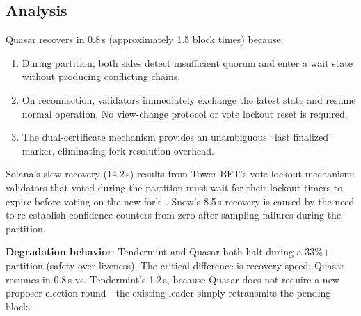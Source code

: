 \subsection{Analysis}

Quasar recovers in 0.8\,s (approximately 1.5 block times) because:

\begin{enumerate}
\item During partition, both sides detect insufficient quorum and enter a wait state
      without producing conflicting chains.
\item On reconnection, validators immediately exchange the latest state and resume
      normal operation. No view-change protocol or vote lockout reset is required.
\item The dual-certificate mechanism provides an unambiguous ``last finalized'' marker,
      eliminating fork resolution overhead.
\end{enumerate}

Solana's slow recovery (14.2\,s) results from Tower BFT's vote lockout mechanism:
validators that voted during the partition must wait for their lockout timers to expire
before voting on the new fork~\cite{solana-wp}. Snow's 8.5\,s recovery is caused by the
need to re-establish confidence counters from zero after sampling failures during the
partition.

\textbf{Degradation behavior}: Tendermint and Quasar both halt during a 33\%+
partition (safety over liveness). The critical difference is recovery speed: Quasar
resumes in 0.8\,s vs. Tendermint's 1.2\,s, because Quasar does not require a new
proposer election round---the existing leader simply retransmits the pending block.

